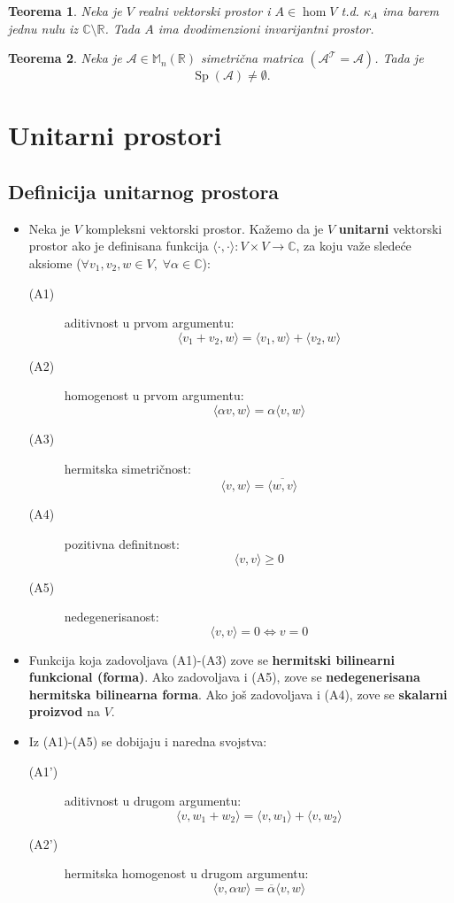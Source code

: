 \documentclass[a4paper,12pt,twoside]{report}
\newtheorem{theorem}{Teorema}[section]
\numberwithin{algorithm}{section}
\begin{document}
\begin{theorem}
    Neka je $V$ realni vektorski prostor i $A \in \hom V$ t.d. $\kappa_A$ ima barem jednu nulu iz $\mathbb{C}\setminus\mathbb{R}$. Tada $A$ ima 
    dvodimenzioni invarijantni prostor.
\end{theorem}

\begin{theorem}
    Neka je $\mathcal{A} \in \mathbb{M}_n(\mathbb{R})$ simetrična matrica $(\mathcal{A^T} = \mathcal{A})$. Tada je \[\operatorname{Sp}(\mathcal{A}) \neq \emptyset.\]
\end{theorem}

\newpage

\section{Unitarni prostori}

\subsection{Definicija unitarnog prostora}
\begin{itemize}
    \item Neka je $V$ kompleksni vektorski prostor. Kažemo da je $V$ \textbf{unitarni} vektorski prostor ako je definisana funkcija $\langle \cdot, \cdot \rangle : V \times V \to \mathbb{C}$, za koju 
važe sledeće aksiome ($\forall v_1, v_2, w \in V, \; \forall \alpha \in \mathbb{C}$):
\begin{description}
    \item[(A1)] aditivnost u prvom argumentu:
    \[ \langle v_1 + v_2, w \rangle = \langle v_1, w \rangle + \langle v_2, w \rangle \]
    \item[(A2)] homogenost u prvom argumentu: \[ \langle \alpha v, w \rangle = \alpha \langle v, w  \rangle \] 
    \item[(A3)] hermitska simetričnost: \[ \langle v, w \rangle = \overline{\langle w, v \rangle} \]
    \item[(A4)] pozitivna definitnost: \[\langle v, v \rangle \geq 0\]
    \item[(A5)] nedegenerisanost: \[\langle v, v \rangle = 0 \iff v = 0\]
\end{description}
    \item Funkcija koja zadovoljava (A1)-(A3) zove se \textbf{hermitski bilinearni funkcional (forma)}. Ako zadovoljava i (A5), zove se \textbf{nedegenerisana hermitska bilinearna forma}. Ako još zadovoljava i (A4), zove se \textbf{skalarni proizvod} na $V$.
    \item Iz (A1)-(A5) se dobijaju i naredna svojstva: \begin{description}
        \item[(A1')] aditivnost u drugom argumentu: \[ \langle v, w_1 + w_2 \rangle = \langle v, w_1 \rangle + \langle v, w_2 \rangle \]
        \item[(A2')] hermitska homogenost u drugom argumentu: \[\langle v, \alpha w \rangle = \overline{\alpha} \langle v, w \rangle\] 
    \end{description}
\end{itemize}
\end{document}
